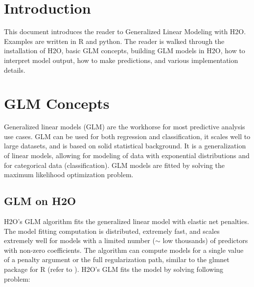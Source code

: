 \newpage

\tableofcontents


\newpage

\section{Introduction}
This document introduces the reader to Generalized Linear Modeling with H2O.  Examples are written in R and python.  The reader is walked through the installation of H2O, basic GLM concepts, building GLM models in H2O, how to interpret model output, how to make predictions, and various implementation details.





\newpage

\section{GLM Concepts}
Generalized linear models (GLM) are the workhorse for most predictive analysis use cases. GLM can be used for both regression and classification, it scales well to large datasets, and is based on solid statistical background. It is a generalization of linear models, allowing for modeling of data with exponential distributions and for categorical data (classification). GLM models are fitted by solving the maximum likelihood optimization problem.

\subsection{GLM on H2O}
H2O's GLM algorithm fits the generalized linear model with elastic net penalties. The model fitting computation is distributed, extremely fast, and scales extremely well for models with a limited number ($\mathtt{\sim}$ low thousands) of predictors with non-zero coefficients. The algorithm can compute models for a single value of a penalty argument or the full regularization path, similar to the glmnet package for R (refer to ). 
H2O's GLM fits the model by solving following problem:

